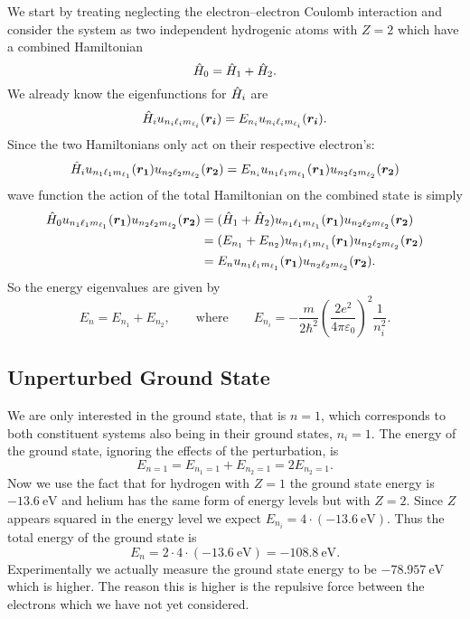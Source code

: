     We start by treating neglecting the electron--electron Coulomb interaction and consider the system as two independent hydrogenic atoms with \(Z = 2\) which have a combined Hamiltonian
    \[\hat{H}_0 = \hat{H}_1 + \hat{H}_2.\]
    We already know the eigenfunctions for \(\hat{H}_i\) are
    \[\hat{H}_iu_{n_i\ell_im_{\ell_i}}(\bm{r_i}) = E_{n_i}u_{n_i\ell_im_{\ell_i}}(\bm{r_i}).\]
    Since the two Hamiltonians only act on their respective electron's:
    \[\hat{H}_iu_{n_1\ell_1m_{\ell_1}}(\bm{r_1})u_{n_2\ell_2m_{\ell_2}}(\bm{r_2}) = E_{n_i}u_{n_1\ell_1m_{\ell_1}}(\bm{r_1})u_{n_2\ell_2m_{\ell_2}}(\bm{r_2})\]
    wave function the action of the total Hamiltonian on the combined state is simply
    \begin{align*}
        \hat{H}_0 u_{n_1\ell_1m_{\ell_1}}(\bm{r_1})u_{n_2\ell_2m_{\ell_2}}(\bm{r_2}) &= (\hat{H}_1 + \hat{H}_2) u_{n_1\ell_1m_{\ell_1}}(\bm{r_1}) u_{n_2\ell_2m_{\ell_2}}(\bm{r_2})\\
        &= (E_{n_1} + E_{n_2}) u_{n_1\ell_1m_{\ell_1}}(\bm{r_1}) u_{n_2\ell_2m_{\ell_2}}(\bm{r_2})\\
        &= E_n u_{n_1\ell_1m_{\ell_1}}(\bm{r_1}) u_{n_2\ell_2m_{\ell_2}}(\bm{r_2}).
    \end{align*}
    So the energy eigenvalues are given by
    \[E_n = E_{n_1} + E_{n_2}, \qquad\text{where}\qquad E_{n_i} = -\frac{m}{2\hbar^2}\left(\frac{2e^2}{4\pi\varepsilon_0}\right)^2\frac{1}{n_i^2}.\]
    
    \subsection{Unperturbed Ground State}
    We are only interested in the ground state, that is \(n = 1\), which corresponds to both constituent systems also being in their ground states, \(n_i = 1\).
    The energy of the ground state, ignoring the effects of the perturbation, is
    \[E_{n=1} = E_{n_1=1} + E_{n_2=1} = 2E_{n_2=1}.\]
    Now we use the fact that for hydrogen with \(Z = 1\) the ground state energy is \(-\SI{13.6}{\electronvolt}\) and helium has the same form of energy levels but with \(Z = 2\).
    Since \(Z\) appears squared in the energy level we expect \(E_{n_i} = 4\cdot(-\SI{13.6}{\electronvolt})\).
    Thus the total energy of the ground state is
    \[E_n = 2\cdot 4 \cdot (-\SI{13.6}{\electronvolt}) = -\SI{108.8}{\electronvolt}.\]
    Experimentally we actually measure the ground state energy to be \(-\SI{78.957}{\electronvolt}\) which is higher.
    The reason this is higher is the repulsive force between the electrons which we have not yet considered.
    
